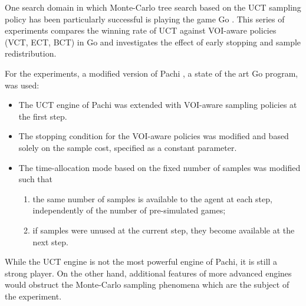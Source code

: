 \documentclass{article}
\begin{document}
One search domain in which Monte-Carlo tree search based on the UCT
sampling policy has been particularly successful is playing the game Go
\cite{Gelly.mogo}. This series of experiments compares
the winning rate of UCT against VOI-aware policies (VCT, ECT, BCT)
in Go and investigates the effect of early stopping and sample
redistribution. 

For the experiments, a modified version of Pachi \cite{Braudis.pachi},
a state of the art Go program, was used:
\begin{itemize}
\item The UCT engine of Pachi was extended with VOI-aware sampling
  policies at the first step. 
\item The stopping condition for the VOI-aware policies was
  modified and based solely on the sample cost, specified as
  a constant parameter. 
\item The time-allocation mode based on the fixed number of samples
  was modified such that 
  \begin{enumerate}
    \item the same number of samples is available to
      the agent at each step, independently of the number of pre-simulated
      games;  
    \item if samples were unused at the current step,
      they become available at the next step.
  \end{enumerate}
\end{itemize}
While the UCT engine is not the most powerful engine of Pachi, it is still
a strong player. On the other hand, additional
features of more advanced engines would obstruct the Monte-Carlo
sampling phenomena which are the subject of the experiment.
\end{document}
